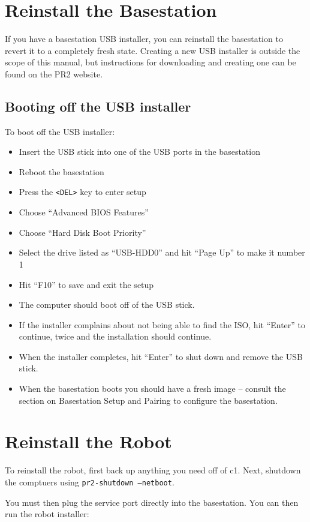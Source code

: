 \section{Reinstall the Basestation}
If you have a basestation USB installer, you can reinstall the
basestation to revert it to a completely fresh state.  Creating a new
USB installer is outside the scope of this manual, but instructions
for downloading and creating one can be found on the PR2 website.

\subsection{Booting off the USB installer}
To boot off the USB installer:
\begin{itemize}
\item Insert the USB stick into one of the USB ports in the basestation
\item Reboot the basestation
\item Press the \texttt{<DEL>} key to enter setup
\item Choose ``Advanced BIOS Features''
\item Choose ``Hard Disk Boot Priority''
\item Select the drive listed as ``USB-HDD0'' and hit ``Page Up'' to make it number 1
\item Hit ``F10'' to save and exit the setup
\item The computer should boot off of the USB stick.
\item If the installer complains about not being able to find the ISO, hit ``Enter'' to continue, twice and the installation should continue.
\item When the installer completes, hit ``Enter'' to shut down and remove the USB stick.
\item When the basestation boots you should have a fresh image -- consult the section on Basestation Setup and Pairing to configure the basestation.
\end{itemize}

\section{Reinstall the Robot}

To reinstall the robot, first back up anything you need off of c1.
Next, shutdown the comptuers using \texttt{pr2-shutdown --netboot}.

You must then plug the service port directly into the basestation.
You can then run the robot installer:

